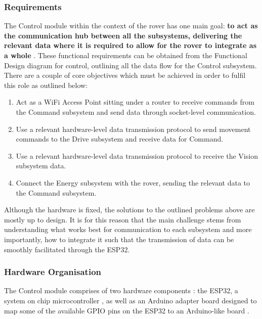 \documentclass[a4paper]{article}
\begin{document}
\subsubsection{Requirements}

The Control module within the context of the rover has one main goal: 
\textbf{to act as the communication hub between all the subsystems, delivering
the relevant data where it is required to allow for the rover to integrate
as a whole} \cite{MarsRoverSpec}.  These functional requirements can be 
obtained from the Functional Design diagram for control, outlining all the 
data flow for the Control subsystem. There are a couple of core objectives 
which must be achieved in order to fulfil this role as outlined below:

\begin{enumerate}
    \item Act as a WiFi Access Point sitting under a router to receive
    commands from the Command subsystem and send data through 
    socket-level communication.
    \item Use a relevant hardware-level data transmission protocol to
    send movement commands to the Drive subsystem and receive data for 
    Command. 
    \item Use a relevant hardware-level data transmission protocol to 
    receive the Vision subsystem data.
    \item Connect the Energy subsystem with the rover, sending the 
    relevant data to the Command subsystem.
\end{enumerate}

Although the hardware is fixed, the solutions to the outlined problems
above are mostly up to design. It is for this reason that the main 
challenge stems from understanding what works best for communication 
to each subsystem and more importantly, how to integrate it such that 
the transmission of data can be smoothly facilitated through the ESP32.

\subsubsection{Hardware Organisation}

The Control module comprises of two hardware components \cite{BoxContent}: 
the ESP32, a system on chip microcontroller \cite{ESP32Datasheet}, as 
well as an Arduino adapter board designed to map some of the available 
GPIO pins on the ESP32 to an Arduino-like board \cite{ESP32ArduinoAdapter}.
\end{document}
